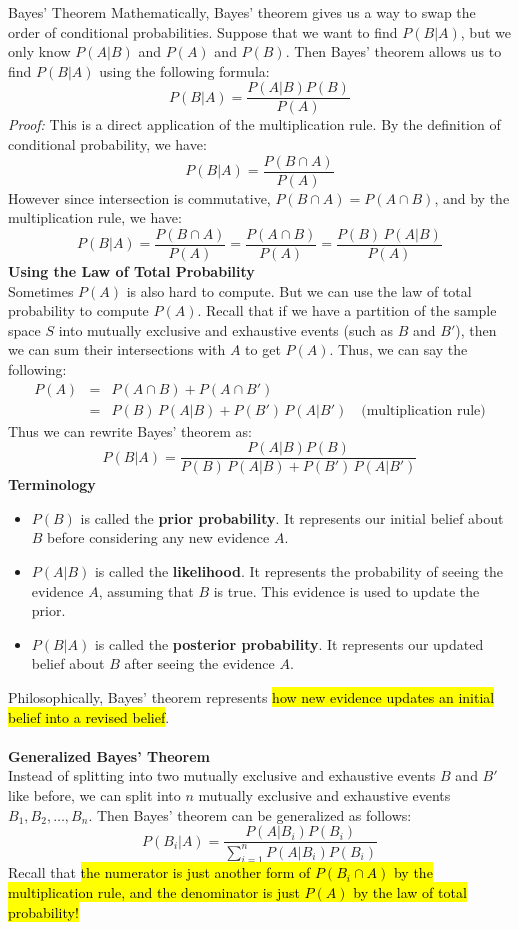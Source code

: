 ﻿\documentclass[12pt]{article}
\begin{document}
\begin{theorem}{Bayes' Theorem}
    Mathematically, Bayes' theorem gives us a way to swap the order of conditional probabilities. Suppose that we want to find $P(B|A)$, but we only know $P(A|B)$ and $P(A)$ and $P(B)$. Then Bayes' theorem allows us to find $P(B|A)$ using the following formula:
    \[P(B|A) = \frac{P(A|B)P(B)}{P(A)}\]
    \textit{Proof:} This is a direct application of the multiplication rule. By the definition of conditional probability, we have:
    \[P(B|A) = \frac{P(B \cap A)}{P(A)}\]
    However since intersection is commutative, $P(B \cap A) = P(A \cap B)$, and by the multiplication rule, we have:
    \[P(B|A) = \frac{P(B \cap A)}{P(A)} = \frac{P(A \cap B)}{P(A)} = \frac{P(B)\,P(A|B)}{P(A)}\]
    \textbf{Using the Law of Total Probability}\\
    Sometimes $P(A)$ is also hard to compute. But we can use the law of total probability to compute $P(A)$. Recall that if we have a partition of the sample space $S$ into mutually exclusive and exhaustive events (such as $B$ and $B'$), then we can sum their intersections with $A$ to get $P(A)$. Thus, we can say the following:
    \begin{eqnarray*}
        P(A) &=& P(A \cap B) + P(A \cap B')\\
        &=& P(B)\,P(A|B) + P(B')\,P(A|B') \quad \text{(multiplication rule)}
    \end{eqnarray*}
    Thus we can rewrite Bayes' theorem as:
    \[P(B|A) = \frac{P(A|B)P(B)}{P(B)\,P(A|B) + P(B')\,P(A|B')}\]
    \textbf{Terminology}
    \begin{itemize}
        \item $P(B)$ is called the \textbf{prior probability}. It represents our initial belief about $B$ before considering any new evidence $A$.
        \item $P(A|B)$ is called the \textbf{likelihood}. It represents the probability of seeing the evidence $A$, assuming that $B$ is true. This evidence is used to update the prior.
        \item $P(B|A)$ is called the \textbf{posterior probability}. It represents our updated belief about $B$ after seeing the evidence $A$.
    \end{itemize}
    Philosophically, Bayes' theorem represents \hl{how new evidence updates an initial belief into a revised belief}.\\\\
    \textbf{Generalized Bayes' Theorem}\\
    Instead of splitting into two mutually exclusive and exhaustive events $B$ and $B'$ like before, we can split into $n$ mutually exclusive and exhaustive events $B_1, B_2, \ldots, B_n$. Then Bayes' theorem can be generalized as follows:
    \[P(B_i|A) = \frac{P(A|B_i)P(B_i)}{\sum_{i=1}^n P(A|B_i)P(B_i)}\]
    Recall that \hl{the numerator is just another form of $P(B_i \cap A)$ by the multiplication rule, and the denominator is just $P(A)$ by the law of total probability!}
\end{theorem}
\end{document}
